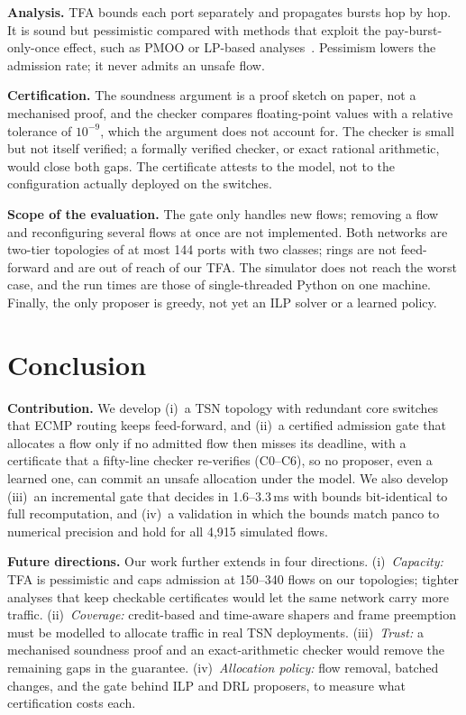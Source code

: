 \documentclass[conference]{IEEEtran}
\begin{document}
\textbf{Analysis.} TFA bounds each port separately and propagates bursts hop by hop. It is sound but pessimistic compared with methods that exploit the pay-burst-only-once effect, such as PMOO or LP-based analyses~\cite{bondorf2014discodnc,bouillard2018dnc}. Pessimism lowers the admission rate; it never admits an unsafe flow.

\textbf{Certification.} The soundness argument is a proof sketch on paper, not a mechanised proof, and the checker compares floating-point values with a relative tolerance of $10^{-9}$, which the argument does not account for. The checker is small but not itself verified; a formally verified checker, or exact rational arithmetic, would close both gaps. The certificate attests to the model, not to the configuration actually deployed on the switches.

\textbf{Scope of the evaluation.} The gate only handles new flows; removing a flow and reconfiguring several flows at once are not implemented. Both networks are two-tier topologies of at most 144 ports with two classes; rings are not feed-forward and are out of reach of our TFA. The simulator does not reach the worst case, and the run times are those of single-threaded Python on one machine. Finally, the only proposer is greedy, not yet an ILP solver or a learned policy.

\section{Conclusion}

\textbf{Contribution.} We develop (i)~a TSN topology with redundant core switches that ECMP routing keeps feed-forward, and (ii)~a certified admission gate that allocates a flow only if no admitted flow then misses its deadline, with a certificate that a fifty-line checker re-verifies (C0--C6), so no proposer, even a learned one, can commit an unsafe allocation under the model. We also develop (iii)~an incremental gate that decides in 1.6--3.3\,ms with bounds bit-identical to full recomputation, and (iv)~a validation in which the bounds match panco to numerical precision and hold for all 4,915 simulated flows.

\textbf{Future directions.} Our work further extends in four directions. (i)~\emph{Capacity:} TFA is pessimistic and caps admission at 150--340 flows on our topologies; tighter analyses that keep checkable certificates would let the same network carry more traffic. (ii)~\emph{Coverage:} credit-based and time-aware shapers and frame preemption must be modelled to allocate traffic in real TSN deployments. (iii)~\emph{Trust:} a mechanised soundness proof and an exact-arithmetic checker would remove the remaining gaps in the guarantee. (iv)~\emph{Allocation policy:} flow removal, batched changes, and the gate behind ILP and DRL proposers, to measure what certification costs each.




\end{document}
